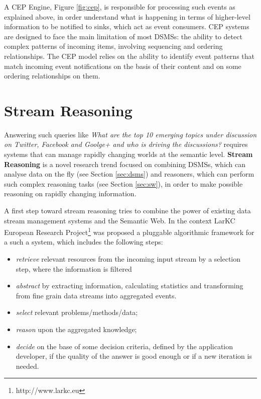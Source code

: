A CEP Engine, Figure \ref{fig:cep}, is responsible for processing such events as explained above, in order understand what is happening in terms of higher-level information to be notified to sinks, which act as event consumers. CEP systems are designed to face the main limitation of most DSMSs: the ability to detect complex patterns of incoming items, involving sequencing and ordering relationships. The CEP model relies on the ability to identify event patterns that match incoming event notifications on the basis of their content and on some ordering relationships on them.


\section{Stream Reasoning}\label{sec:sfp}

Answering such queries like \textit{What are the top 10 emerging topics under discussion on Twitter, Facebook and Goolge+ and who is driving the discussions?} requires systems that can manage rapidly changing worlds at the semantic level. \textbf{Stream Reasoning} is a novel research trend focused on combining DSMSs, which can analyse data on the fly (see Section \ref{sec:dsms}) and reasoners, which can perform such complex reasoning tasks (see Section \ref{sec:sw}), in order to make possible reasoning on rapidly changing information.

A first step toward stream reasoning \cite{DBLP:conf/fis/ValleCBBC08} tries to combine the power of existing data stream management systems and the Semantic Web. In the context LarKC European Research Project\footnote{http://www.larkc.eu} \cite{4597242, 4120457} was proposed a pluggable algorithmic framework for a such a system, which includes the following steps:
\begin{itemize}
\item[1.] \textit{retrieve} relevant resources from the incoming input stream by a selection step, where the information is filtered
\item[2.] \textit{abstract} by extracting information, calculating statistics and transforming from fine grain data streams into aggregated events.
\item[3.] \textit{select} relevant problems/methods/data;
\item[4.] \textit{reason} upon the aggregated knowledge; 
\item[5.] \textit{decide} on the base of some decision criteria, defined by the application developer, if the quality of the answer is good enough or if a new iteration is needed.
\end{itemize} 


